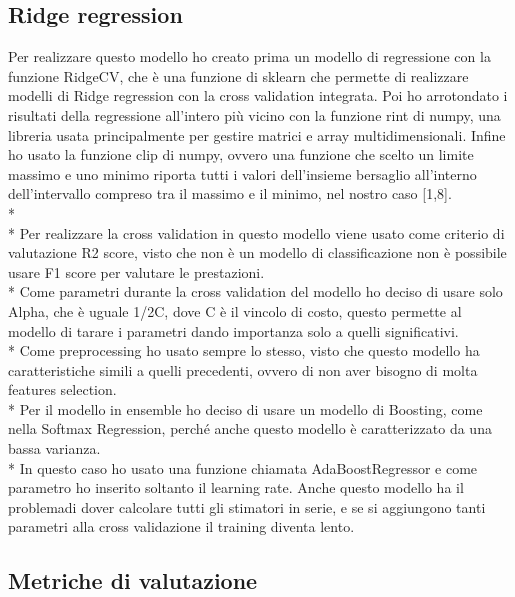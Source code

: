 \subsection{Ridge regression}\label{Ridge}
\normalsize
Per realizzare questo modello ho creato prima un modello di regressione con la funzione RidgeCV, che è una funzione di sklearn che permette di realizzare modelli di Ridge regression con la cross validation integrata. Poi ho arrotondato i risultati della regressione all’intero più vicino con la funzione rint di numpy, una libreria usata principalmente per gestire matrici e array multidimensionali. Infine ho usato la funzione clip di numpy, ovvero una funzione che scelto un limite massimo e uno minimo riporta tutti i valori dell'insieme bersaglio all'interno dell'intervallo compreso tra il massimo e il minimo, nel nostro caso [1,8].\\*\\*
Per realizzare la cross validation in questo modello viene usato come criterio di valutazione R2 score, visto che non è un modello di classificazione non è possibile usare F1 score per valutare le prestazioni.\\*
Come parametri durante la cross validation del modello ho deciso di usare solo Alpha, che è uguale 1/2C, dove C è il vincolo di costo, questo permette al modello di tarare i parametri dando importanza solo a quelli significativi.\\*
Come preprocessing ho usato sempre lo stesso, visto che questo modello ha caratteristiche simili a quelli precedenti, ovvero di non aver bisogno di molta features selection.\\*
Per il modello in ensemble ho deciso di usare un modello di Boosting, come nella Softmax Regression, perché anche questo modello è caratterizzato da una bassa varianza.\\*
In questo caso ho usato una funzione chiamata AdaBoostRegressor e come parametro ho inserito soltanto il learning rate. Anche questo modello ha il problemadi dover calcolare tutti gli stimatori in serie, e se si aggiungono tanti parametri alla cross validazione il training diventa lento.
\subsection{Metriche di valutazione}\label{valutazione}
\normalsize


